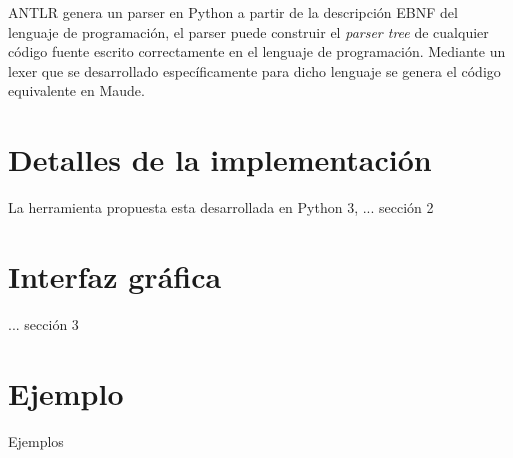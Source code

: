 ANTLR genera un parser en Python a partir de la descripci\'on EBNF del lenguaje de programaci\'on, el parser puede construir el \textit{parser tree} de cualquier c\'odigo fuente escrito correctamente en el lenguaje de programaci\'on. Mediante un lexer que se  desarrollado espec\'ificamente para dicho lenguaje se genera el c\'odigo equivalente en Maude. 

\section{Detalles de la implementaci\'on}
\label{implem.envir}

La herramienta propuesta esta desarrollada en Python 3, 
... secci\'on 2

\section{Interfaz gr\'afica}
\label{gui.envir}

... secci\'on 3

\section{Ejemplo}
\label{example.envir}

Ejemplos